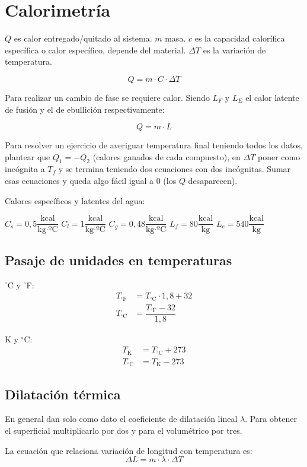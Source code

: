 \section{Calorimetría}

$Q$ es calor entregado/quitado al sistema. $m$ masa. $c$ es la capacidad calorífica específica o calor específico, depende del material. $\Delta T$ es la variación de temperatura.

$$ Q = m \cdot C \cdot \Delta T$$

Para realizar un cambio de fase se requiere calor. Siendo $L_F$ y $L_E$ el calor latente de fusión y el de ebullición respectivamente:

$$Q = m \cdot L$$

Para resolver un ejercicio de averiguar temperatura final teniendo todos los datos, plantear que $Q_1=-Q_2$ (calores ganados de cada compuesto), en $\Delta T$ poner como incógnita a $T_f$ y se termina teniendo dos ecuaciones con dos incógnitas. Sumar esas ecuaciones y queda algo fácil igual a 0 (los $Q$ desaparecen).

\skipline
Calores específicos y latentes del agua:

\vspace{0.5\baselineskip}
\hfil
$C_s=0,5 \dfrac{\text{kcal}}{\text{kg} \cdot \text{ºC}}$\hfil
$C_l=1 \dfrac{\text{kcal}}{\text{kg} \cdot \text{ºC}}$\hfil
$C_g=0,48 \dfrac{\text{kcal}}{\text{kg} \cdot \text{ºC}}$\hfil
$L_f = 80 \dfrac{\text{kcal}}{\text{kg}}$\hfil
$L_e = 540 \dfrac{\text{kcal}}{\text{kg}}$\hfil


\subsection*{Pasaje de unidades en temperaturas}

\begin{multicols}{2}
$^\circ$C y $^\circ$F:
\vspace{-\baselineskip}
\begin{align*}
T_{^\circ\text{F}}&= T_{\text{$^\circ$C}} \cdot 1,8 + 32\\
T_{\text{$^\circ$C}} &= \dfrac{T_{^\circ\text{F}}-32}{1,8}
\end{align*}

K y $^\circ$C:
\vspace{-\baselineskip}
\begin{align*}
T_{\text{K}}&=T_{\text{$^\circ$C}} + 273\\
T_{\text{$^\circ$C}} &=  T_{\text{K}} - 273
\end{align*}
\end{multicols}

\subsection*{Dilatación térmica}

En general dan solo como dato el coeficiente de dilatación lineal $\lambda$. Para obtener el superficial multiplicarlo por dos y para el volumétrico por tres.

La ecuación que relaciona variación de longitud con temperatura es:
$$\Delta L = m \cdot \lambda \cdot \Delta T$$